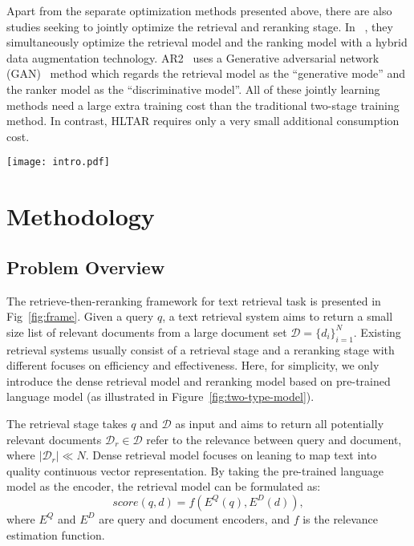 \documentclass[11pt]{article}
\begin{document}
Apart from the separate optimization methods presented above, there are also studies seeking to jointly optimize the retrieval and reranking stage. In ~\cite{ren2021rocketqav2}, they simultaneously optimize the retrieval model and the ranking model with a hybrid data augmentation technology. AR2~\cite{zhang2021adversarial} uses a Generative adversarial network (GAN)~\cite{creswell2018generative} method which regards the retrieval model as the ``generative mode'' and the ranker model as the ``discriminative model''. All of these jointly learning methods need a large extra training cost than the traditional two-stage training method. In contrast, HLTAR requires only a very small additional consumption cost.

\begin{figure*}
    \centering
    \texttt{[image: intro.pdf]}   
    \caption{An illusion of the conventional retrieve-then-reranking framework (solid line part) and our HLTAR ranking model (solid line and dashed line part).}
    \label{fig:frame}
\end{figure*}


\section{Methodology}

\subsection{Problem Overview}
The retrieve-then-reranking framework for text retrieval task is presented in Fig~\ref{fig:frame}. Given a query $q$, a text retrieval system aims to return a small size list of relevant documents from a large document set $\mathcal{D}=\{d_i\}_{i=1}^N$. Existing retrieval systems usually consist of a retrieval stage and a reranking stage with different focuses on efficiency and effectiveness. Here, for simplicity, we only introduce the dense retrieval model and reranking model based on pre-trained language model (as illustrated in Figure~\ref{fig:two-type-model}).

The retrieval stage takes $q$ and $\mathcal{D}$ as input and aims to return all potentially relevant documents $\mathcal{D}_r \in \mathcal{D}$ refer to the relevance between query and document, where $|\mathcal{D}_r| \ll N$. Dense retrieval model focuses on leaning to map text into quality continuous vector representation. By taking the pre-trained language model as the encoder, the retrieval model can be formulated as:
\begin{equation}
\label{eq:retrieval}
    score(q,d) = f(E^Q(q), E^D(d)),
\end{equation}
where $E^Q$ and $E^D$ are query and document encoders, and $f$ is the relevance estimation function.
\end{document}
